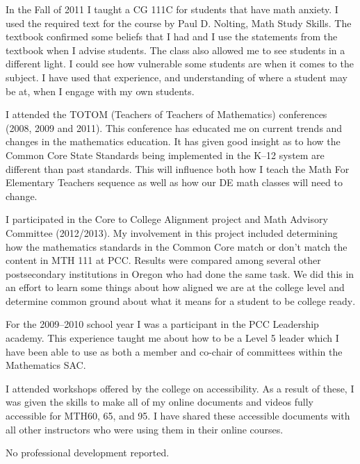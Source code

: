 \begin{description}[style=nextline]
	In the Fall of 2011 I taught a CG 111C for students that have math anxiety.  I
	used the required text for the course by Paul D. Nolting, Math Study
	Skills.  The textbook confirmed some beliefs that I had and I use the
	statements from the textbook when I advise students.   The class also allowed
	me to see students in a
	different light. I could see how vulnerable some students are when it comes to
	the subject.  I have used that experience, and understanding of where a student
	may be at, when I engage with my own students.

	\item[Emily Nelson (Full-time Instructor, Rock Creek Campus)]
	I attended the TOTOM (Teachers of Teachers of Mathematics) conferences (2008,
	2009 and 2011).  This conference has educated me on current trends and changes
	in the mathematics education.  It has given good insight as to how the Common
	Core State Standards being implemented in the K--12 system are different than
	past standards. This will influence both how I teach the Math For Elementary
	Teachers sequence as well as how our DE math classes will need to change.

	I participated in the Core to College Alignment project and Math Advisory
	Committee (2012/2013).  My involvement in this project included determining how
	the mathematics standards in the Common Core match or don't match the
	content in MTH 111 at PCC. Results were compared among several other
	postsecondary institutions in Oregon who had done the same task.  We did this
	in an effort to learn some things about how aligned we are at the college level
	and determine common ground about what it means for a student to be college ready.

	\item[Kimberly Neuburger (Full-time Instructor, Sylvania Campus)]
	For the 2009--2010 school year I was a participant in the PCC Leadership
	academy. This experience taught me about how to be a Level 5 leader which I
	have been able to use as both a member and co-chair of committees within the
	Mathematics SAC.

	I attended workshops offered by the college on accessibility. As a result of
	these, I was given the skills to make all of my online documents and videos
	fully accessible for MTH60, 65, and 95. I have shared these accessible
	documents with all other instructors who were using them in their online
	courses.

	\item[Scott Perry (Full-time Instructor, Sylvania Campus)]
	No professional development reported.


\end{description}
